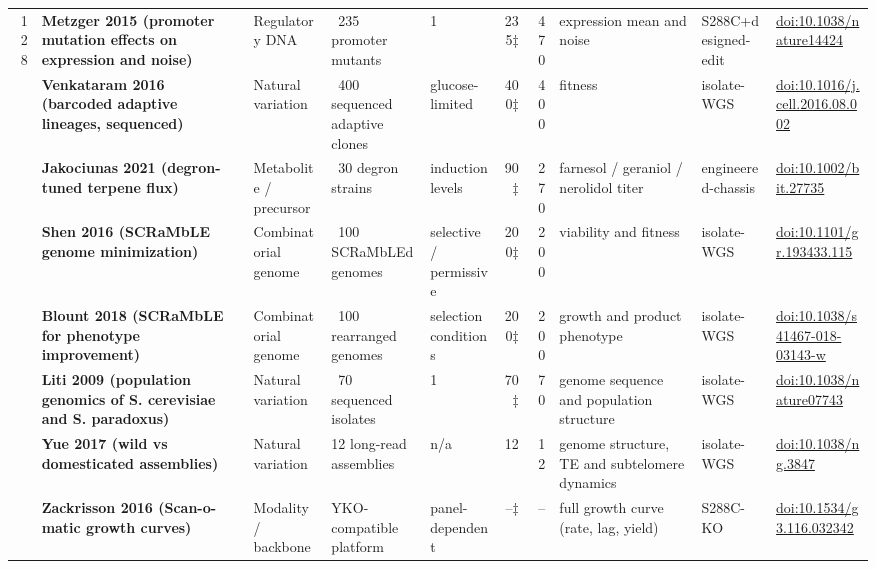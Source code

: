 \begin{landscape}
\begin{longtable}{@{}r@{\hspace{4pt}} L{42mm} L{21mm} L{26mm} L{20mm} r@{\hspace{5pt}} r@{\hspace{5pt}} L{30mm} L{23mm} L{34mm}@{}}
128 & \textbf{Metzger 2015 (promoter mutation effects on expression and noise)} & Regulatory DNA & ~235 promoter mutants & 1 & 235$\ddagger$ & 470 & expression mean and noise & S288C+\allowbreak designed-\allowbreak edit & \href{https://doi.org/10.1038/nature14424}{doi:10.1038/\allowbreak nature14424} \\
 & \textbf{Venkataram 2016 (barcoded adaptive lineages, sequenced)} & Natural variation & ~400 sequenced adaptive clones & glucose-limited & 400$\ddagger$ & 400 & fitness & isolate-\allowbreak WGS & \href{https://doi.org/10.1016/j.cell.2016.08.002}{doi:10.1016/\allowbreak j.cell.2016.08.002} \\
 & \textbf{Jakociunas 2021 (degron-tuned terpene flux)} & Metabolite / precursor & ~30 degron strains & induction levels & 90$\ddagger$ & 270 & farnesol / geraniol / nerolidol titer & engineered-\allowbreak chassis & \href{https://doi.org/10.1002/bit.27735}{doi:10.1002/\allowbreak bit.27735} \\
 & \textbf{Shen 2016 (SCRaMbLE genome minimization)} & Combinatorial genome & ~100 SCRaMbLEd genomes & selective / permissive & 200$\ddagger$ & 200 & viability and fitness & isolate-\allowbreak WGS & \href{https://doi.org/10.1101/gr.193433.115}{doi:10.1101/\allowbreak gr.193433.115} \\
 & \textbf{Blount 2018 (SCRaMbLE for phenotype improvement)} & Combinatorial genome & ~100 rearranged genomes & selection conditions & 200$\ddagger$ & 200 & growth and product phenotype & isolate-\allowbreak WGS & \href{https://doi.org/10.1038/s41467-018-03143-w}{doi:10.1038/\allowbreak s41467-018-03143-w} \\
 & \textbf{Liti 2009 (population genomics of S. cerevisiae and S. paradoxus)} & Natural variation & ~70 sequenced isolates & 1 & 70$\ddagger$ & 70 & genome sequence and population structure & isolate-\allowbreak WGS & \href{https://doi.org/10.1038/nature07743}{doi:10.1038/\allowbreak nature07743} \\
 & \textbf{Yue 2017 (wild vs domesticated assemblies)} & Natural variation & 12 long-read assemblies & n/a & 12 & 12 & genome structure, TE and subtelomere dynamics & isolate-\allowbreak WGS & \href{https://doi.org/10.1038/ng.3847}{doi:10.1038/\allowbreak ng.3847} \\
 & \textbf{Zackrisson 2016 (Scan-o-matic growth curves)} & Modality / backbone & YKO-compatible platform & panel-dependent & --$\ddagger$ & -- & full growth curve (rate, lag, yield) & S288C-\allowbreak KO & \href{https://doi.org/10.1534/g3.116.032342}{doi:10.1534/\allowbreak g3.116.032342} \\

\end{longtable}
\end{landscape}
